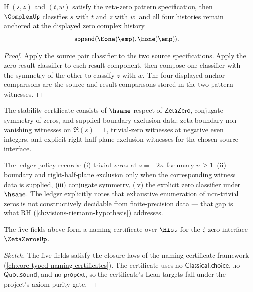 \begin{theorem}
\label{thm:zeta-zero-pattern-spec-pair-classifier}
If \((s,z)\) and \((t,w)\) satisfy the zeta-zero pattern specification, then
\(\ComplexUp\) classifies \(s\) with \(t\) and \(z\) with \(w\), and all four
histories remain anchored at the displayed zero complex history
$$
\mathsf{append}(\Eone(\emp),\Eone(\emp)).
$$
\end{theorem}
\begin{proof}
Apply the source pair classifier to the two source specifications. Apply the
zero-result classifier to each result component, then compose one classifier
with the symmetry of the other to classify \(z\) with \(w\). The four displayed
anchor comparisons are the source and result comparisons stored in the two
pattern witnesses.
\end{proof}

\begin{definition}
\label{def:zeta-zero-stability-cert}
The stability certificate consists of $\hsame$-respect of $\mathsf{ZetaZero}$, conjugate symmetry of zeros, and supplied boundary exclusion data: zeta boundary non-vanishing witnesses on $\Re(s)=1$, trivial-zero witnesses at negative even integers, and explicit right-half-plane exclusion witnesses for the chosen source interface.
\end{definition}

\begin{definition}
\label{def:zeta-zero-ledger-policy}
The ledger policy records: (i) trivial zeros at $s = -2n$ for unary $n \geq 1$, (ii) boundary and right-half-plane exclusion only when the corresponding witness data is supplied, (iii) conjugate symmetry, (iv) the explicit zero classifier under $\hsame$. The ledger explicitly notes that exhaustive enumeration of non-trivial zeros is not constructively decidable from finite-precision data --- that gap is what RH (\autoref{ch:visions-riemann-hypothesis}) addresses.
\end{definition}

\begin{theorem}
\label{thm:zeta-zeros-namecert}
The five fields above form a naming certificate over \(\Hist\) for the \(\zeta\)-zero interface \(\ZetaZerosUp\).
\end{theorem}
\begin{proof}[Sketch]
The five fields satisfy the closure laws of the naming-certificate framework (\autoref{ch:core-typed-naming-certificates}). The certificate uses no \(\mathsf{Classical.choice}\), no \(\mathsf{Quot.sound}\), and no \(\mathsf{propext}\), so the certificate's Lean targets fall under the project's axiom-purity gate.
\end{proof}

